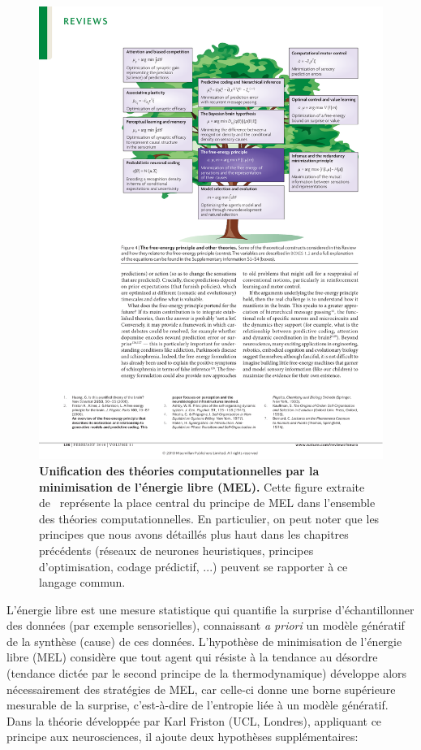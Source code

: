 \documentclass[11pt,french,a4paper,oneside]{article}%
\begin{document}
\begin{figure}%
\centerline{\includegraphics[width=\linewidth]{friston10c_fig4.pdf}}
\caption{\textbf{Unification des théories computationnelles par la minimisation de l'énergie libre (MEL).}
Cette figure extraite de~\citep{Friston10c} représente la place central du principe de MEL dans l'ensemble des théories computationnelles. En particulier, on peut noter que les principes que nous avons détaillés plus haut dans les chapitres précédents (réseaux de neurones heuristiques, principes d'optimisation, codage prédictif, ...) peuvent se rapporter à ce langage commun. %
 }%
\label{fig:friston10c_fig4}%
\end{figure}%
L'énergie libre est une mesure statistique qui quantifie la surprise d'échantillonner des données (par exemple sensorielles), connaissant \emph{a priori} un modèle génératif de la synthèse (cause) de ces données. L'hypothèse de minimisation de l'énergie libre (MEL) considère que tout agent qui résiste à la tendance au désordre (tendance dictée par le second principe de la thermodynamique) développe alors nécessairement des stratégies de MEL, car celle-ci donne une borne supérieure mesurable de la surprise, c'est-à-dire de l'entropie liée à un modèle génératif. Dans la théorie développée par Karl Friston (UCL, Londres), appliquant ce principe aux neurosciences, il ajoute deux hypothèses supplémentaires:
\end{document}
